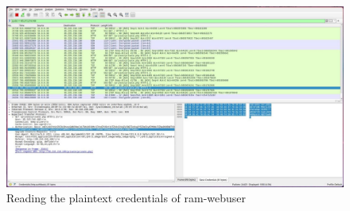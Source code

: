 \documentclass[a4paper]{article}
\begin{document}
\begin{figure}[!htbp]
	\includegraphics[scale=0.25]{images/ram_snifa.png}
	\centering
	\caption{Reading the plaintext credentials of ram-webuser}
\end{figure}
\newpage
\end{document}

